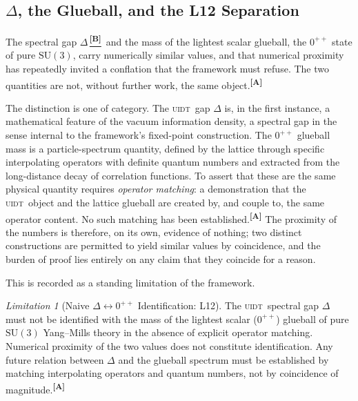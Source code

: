 \documentclass[12pt,a4paper,twoside]{article}
\theoremstyle{plain}
\theoremstyle{definition}
\theoremstyle{remark}
\newtheorem{limitation}[theorem]{Limitation}
\newcommand{\UIDT}{\textsc{uidt}}
\newcommand{\catmark}[1]{\textsuperscript{\textsf{\textbf{[#1]}}}}
\newcommand{\Bdelta}{\hyperref[box:pi-override-delta]{\catmark{B}}}
\begin{document}
\subsection{\texorpdfstring{$\Delta$}{Delta}, the Glueball, and the L12 Separation}
\label{subsec:delta-glueball-l12}

The spectral gap $\Delta$\,\Bdelta\ and the mass of the lightest scalar glueball, the $0^{++}$ state of pure $\mathrm{SU}(3)$, carry numerically similar values, and that numerical proximity has repeatedly invited a conflation that the framework must refuse. The two quantities are not, without further work, the same object.\catmark{A}

The distinction is one of category. The \UIDT\ gap $\Delta$ is, in the first instance, a mathematical feature of the vacuum information density, a spectral gap in the sense internal to the framework's fixed-point construction. The $0^{++}$ glueball mass is a particle-spectrum quantity, defined by the lattice through specific interpolating operators with definite quantum numbers and extracted from the long-distance decay of correlation functions. To assert that these are the same physical quantity requires \emph{operator matching}: a demonstration that the \UIDT\ object and the lattice glueball are created by, and couple to, the same operator content. No such matching has been established.\catmark{A} The proximity of the numbers is therefore, on its own, evidence of nothing; two distinct constructions are permitted to yield similar values by coincidence, and the burden of proof lies entirely on any claim that they coincide for a reason.

This is recorded as a standing limitation of the framework.

\begin{limitation}[Naive $\Delta\!\leftrightarrow\!0^{++}$ Identification: L12]
\label{lim:L12}
The \UIDT\ spectral gap $\Delta$ must not be identified with the mass of the lightest scalar ($0^{++}$) glueball of pure $\mathrm{SU}(3)$ Yang--Mills theory in the absence of explicit operator matching. Numerical proximity of the two values does not constitute identification. Any future relation between $\Delta$ and the glueball spectrum must be established by matching interpolating operators and quantum numbers, not by coincidence of magnitude.\catmark{A}
\end{limitation}
\end{document}
